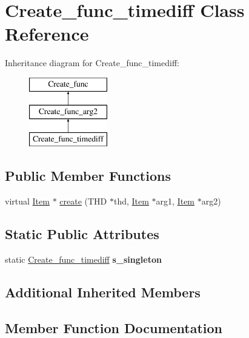 \hypertarget{classCreate__func__timediff}{}\section{Create\+\_\+func\+\_\+timediff Class Reference}
\label{classCreate__func__timediff}
Inheritance diagram for Create\+\_\+func\+\_\+timediff\+:\begin{figure}[H]
\begin{center}
\leavevmode
\includegraphics[height=3.000000cm]{classCreate__func__timediff}
\end{center}
\end{figure}
\subsection*{Public Member Functions}
\begin{DoxyCompactItemize}
\item 
virtual \mbox{\hyperlink{classItem}{Item}} $\ast$ \mbox{\hyperlink{classCreate__func__timediff_a2c8fd221232911a1d79da1e13af00c02}{create}} (T\+HD $\ast$thd, \mbox{\hyperlink{classItem}{Item}} $\ast$arg1, \mbox{\hyperlink{classItem}{Item}} $\ast$arg2)
\end{DoxyCompactItemize}
\subsection*{Static Public Attributes}
\begin{DoxyCompactItemize}
\item 
\mbox{\label{classCreate__func__timediff_ab22d583acc2970fb1691107d93be5704}} 
static \mbox{\hyperlink{classCreate__func__timediff}{Create\+\_\+func\+\_\+timediff}} {\bfseries s\+\_\+singleton}
\end{DoxyCompactItemize}
\subsection*{Additional Inherited Members}


\subsection{Member Function Documentation}
\mbox{\label{classCreate__func__timediff_a2c8fd221232911a1d79da1e13af00c02}} 
